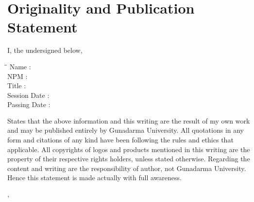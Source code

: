 \begingroup
\let\clearpage\relax
\let\cleardoublepage\relax

\chapter*{Originality and Publication Statement}
\label{chap:sig-statement}

I, the undersigned below,

\begin{tabbing}
\hspace*{3cm}\=\hspace*{0.5cm}\= \kill
Name \>:\> \myName \\
NPM \>:\> \myNPM \\
Title \>:\> \myDepTitle \\
Session Date \>:\> \myDateSession \\
Passing Date \>:\> \myDatePassing
\end{tabbing}

States that the above information and this writing are the result of my own work and may be published entirely by Gunadarma University.
All quotations in any form and citations of any kind have been following the rules and ethics that applicable.
All copyrights of logos and products mentioned in this writing are the property of their respective rights holders, unless stated otherwise.
Regarding the content and writing are the responsibility of author, not Gunadarma University.
Hence this statement is made actually with full awareness.

\hfill

\begin{flushright}
\myCity, \myYearLast
\end{flushright}

\hfill

\begin{flushright}
\myName
\end{flushright}

\endgroup
